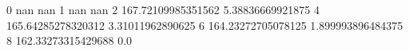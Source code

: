 0 nan nan
1 nan nan
2 167.72109985351562 5.38836669921875
4 165.64285278320312 3.31011962890625
6 164.23272705078125 1.899993896484375
8 162.33273315429688 0.0
